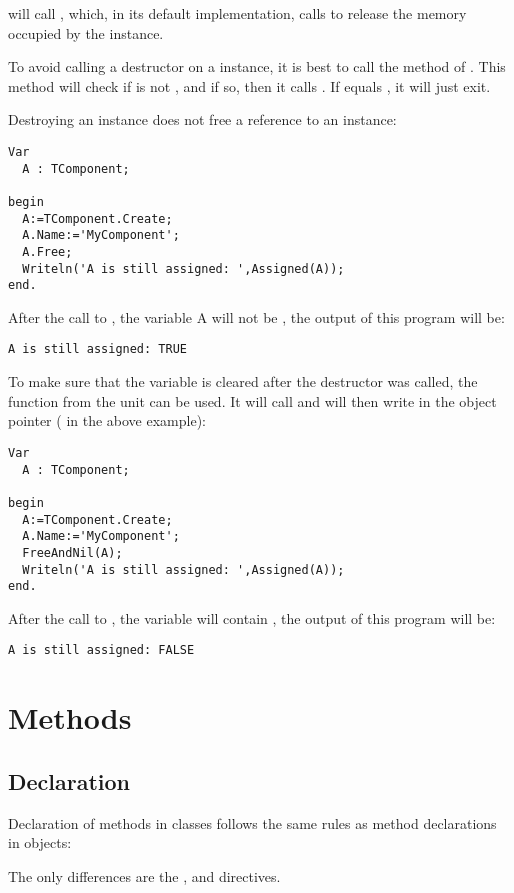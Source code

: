  will call , which, in its default implementation,
calls  to release the memory occupied by the instance.

To avoid calling a destructor on a  instance, it is best to call
the  method of . This method will check if  is not , 
and if so, then it calls . If  equals , it
will just exit.

Destroying an instance does not free a reference to an instance:
\begin{verbatim}
Var
  A : TComponent;

begin
  A:=TComponent.Create;
  A.Name:='MyComponent';
  A.Free;
  Writeln('A is still assigned: ',Assigned(A));
end.
\end{verbatim}
After the call to , the variable A will not be , the
output of this program will be:
\begin{verbatim}
A is still assigned: TRUE
\end{verbatim}
To make sure that the variable  is cleared after the destructor was called,
the function  from the  unit can be used. It
will call  and will then write  in the object pointer (
in the above example):
\begin{verbatim}
Var
  A : TComponent;

begin
  A:=TComponent.Create; 
  A.Name:='MyComponent';
  FreeAndNil(A);
  Writeln('A is still assigned: ',Assigned(A));
end.
\end{verbatim}
After the call to , the variable  will contain , the
output of this program will be:
\begin{verbatim}
A is still assigned: FALSE
\end{verbatim}


\section{Methods}
\subsection{Declaration}
Declaration of methods in classes follows the same rules as method
declarations in objects:

The only differences are the ,  and
 directives.

